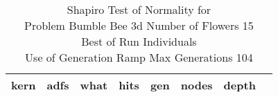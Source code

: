 \begin{table}[H]
\caption{Shapiro Test of Normality for \\ Problem  Bumble Bee 3d  Number of Flowers 15\\Best of Run Individuals \\ Use of Generation Ramp  Max Generations 104\\}
\begin{center}
\scalebox{0.8} %
{
\begin{tabular}{lrrrrrrr}
\hline
kern & adfs & what & hits & gen & nodes & depth \\
\hline


\end{tabular}
}
\end{center}
\end{table}

